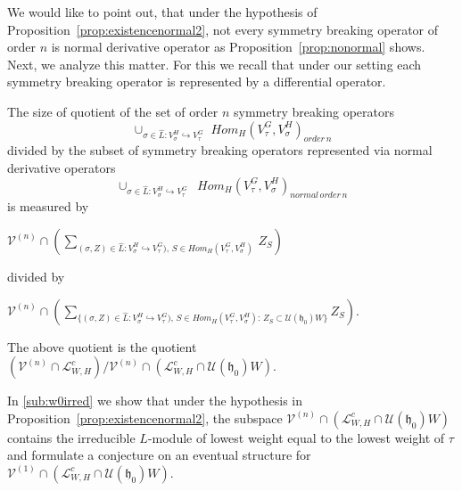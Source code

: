 \documentclass[12pt]{amsart}
\theoremstyle{definition}
\theoremstyle{remark}
\newcommand{\h}{\mathfrak{h}}
\numberwithin{equation}{section}
\begin{document}
We would like to point out, that under the hypothesis of   Proposition~\ref{prop:existencenormal2}, not every symmetry breaking operator of order $n$ is normal derivative operator as Proposition~\ref{prop:nonormal} shows. Next, we analyze this matter. For this we recall that under our setting each symmetry breaking operator is represented by a differential operator.


The size of  quotient of the set of order $n$ symmetry breaking operators
\begin{equation*}  \cup_{\sigma \in \widehat L: V_\sigma^H \hookrightarrow V_\tau^G}\,\,    Hom_H( V_\tau^G, V_\sigma^H)_{order\, n}     \end{equation*}
\noindent
  divided by the subset of symmetry breaking operators represented via normal derivative operators \begin{equation*}  \cup_{\sigma \in \widehat L: V_\sigma^H \hookrightarrow V_\tau^G}   \,\,\, Hom_H( V_\tau^G, V_\sigma^H)_{normal\,order\, n}      \end{equation*} is measured  by

\begin{center}$\mathcal V^{(n)}\cap(\sum_{ (\sigma,Z) \in \widehat L: V_\sigma^H \hookrightarrow V_\tau^G),  \,    S \in Hom_H( V_\tau^G, V_\sigma^H)  }    \, Z_S)$\end{center} divided by

\begin{center}$\mathcal V^{(n)}\cap(\sum_{ \{ (\sigma,Z) \in \widehat L: V_\sigma^H \hookrightarrow V_\tau^G),  \, S \in Hom_H( V_\tau^G, V_\sigma^H) :\, Z_S \subset \mathcal U(\h_0)W   \} } Z_S).$ \end{center}

\noindent
The above quotient    is the quotient \\ \phantom{xxxxxxxxxxxxxxxx}$(\mathcal V^{(n)}\cap \mathcal L_{W,H}^c )/\mathcal V^{(n)}\cap (\mathcal L_{W,H}^c \cap \mathcal U(\h_0)W)$.

\noindent
In \ref{sub:w0irred} we show that under the hypothesis in Proposition~\ref{prop:existencenormal2}, the subspace $\mathcal V^{(n)}\cap (\mathcal L_{W,H}^c \cap \mathcal U(\h_0)W)$ contains the irreducible $L$-module of lowest weight equal to the lowest weight of $\tau$ and formulate a conjecture on an eventual structure for $\mathcal V^{(1)}\cap (\mathcal L_{W,H}^c \cap \mathcal U(\h_0)W)$.
\end{document}
